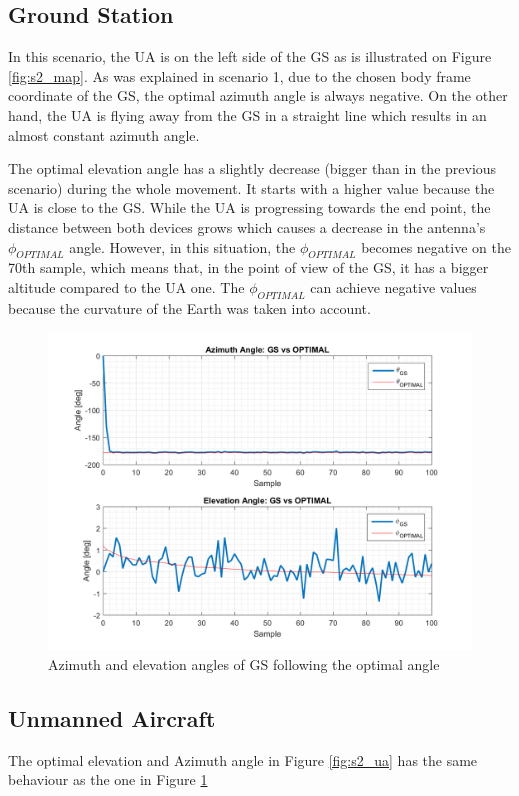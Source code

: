 \subsection{Ground Station}
In this scenario, the UA is on the left side of the GS as is illustrated on Figure \ref{fig:s2_map}. As was explained in scenario 1, due to the chosen body frame coordinate of the GS, the optimal azimuth angle is always negative. On the other hand, the UA is flying away from the GS in a straight line which results in an almost constant azimuth angle. 

The optimal elevation angle has a slightly decrease (bigger than in the previous scenario) during the whole movement. It starts with a higher value because the UA is close to the GS. While the UA is progressing towards the end point, the distance between both devices grows which causes a decrease in the antenna's $\phi_{OPTIMAL}$ angle. However, in this situation, the $\phi_{OPTIMAL}$ becomes negative on the 70th sample, which means that, in the point of view of the GS, it has a bigger altitude compared to the UA one. The $\phi_{OPTIMAL}$ can achieve negative values because the curvature of the Earth was taken into account.

\begin{figure}[H]
	\centering
	\includegraphics[scale=0.75]{figures/s2_gs.png}
	\caption{Azimuth and elevation angles of GS following the optimal angle}
	\label{fig:s2_gs}
\end{figure}

\subsection{Unmanned Aircraft}
The optimal elevation and Azimuth angle in Figure \ref{fig:s2_ua} has the same behaviour as the one in Figure \ref{fig:s2_gs} 

